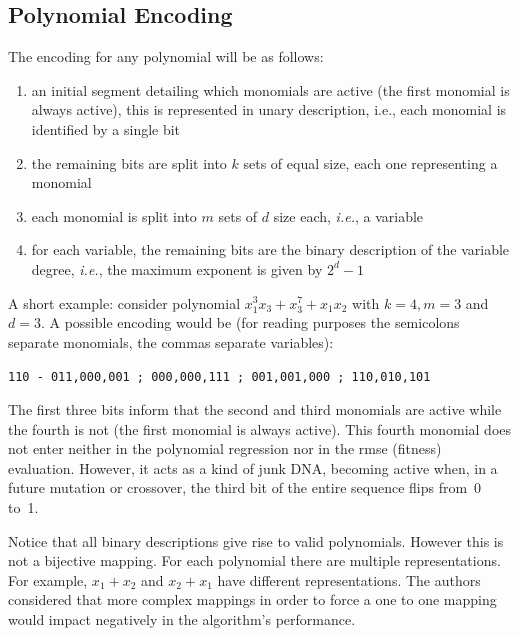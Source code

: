 \documentclass[preprint,authoryear,12pt]{elsarticle}
\begin{document}
\subsection{Polynomial Encoding}\label{subs:polynomial.encoding}
%
The encoding for any polynomial will be as follows:
\begin{enumerate}
\item an initial segment detailing which monomials are active (the first monomial is always active), this is represented in unary description, i.e., each monomial is identified by a single bit
\item the remaining bits are split into $k$ sets of equal size, each one representing a monomial
\item each monomial is split into $m$ sets of $d$ size each, \emph{i.e.}, a variable
\item for each variable, the remaining bits are the binary description of the variable degree, \emph{i.e.}, the maximum exponent is given by $2^d-1$
\end{enumerate}

A short example: consider polynomial $x_1^3 x_3 + x_3^7 + x_1 x_2$ with $k = 4, m = 3$ and $d=3$. A possible encoding would be (for reading purposes the semicolons separate monomials, the commas separate variables):
\begin{center}
\texttt{110 - 011,000,001 ; 000,000,111 ; 001,001,000 ; 110,010,101}
\end{center}

The first three bits inform that the second and third monomials are active while the fourth is not (the first monomial is always active). This fourth monomial does not enter neither in the polynomial regression nor in the \ac{rmse} (fitness) evaluation. However, it acts as a kind of junk DNA, becoming active when, in a future mutation or crossover, the third bit of the entire sequence flips from~0 to~1.


Notice that all binary descriptions give rise to valid polynomials. However this is not a bijective mapping. For each polynomial there are multiple representations. For example, $x_1+x_2$ and $x_2+x_1$ have different representations. The authors considered that more complex mappings in order to force a one to one mapping would impact negatively in the algorithm's performance.
\end{document}
